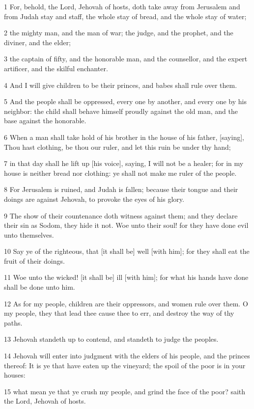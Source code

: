 \par 1 For, behold, the Lord, Jehovah of hosts, doth take away from Jerusalem and from Judah stay and staff, the whole stay of bread, and the whole stay of water;
\par 2 the mighty man, and the man of war; the judge, and the prophet, and the diviner, and the elder;
\par 3 the captain of fifty, and the honorable man, and the counsellor, and the expert artificer, and the skilful enchanter.
\par 4 And I will give children to be their princes, and babes shall rule over them.
\par 5 And the people shall be oppressed, every one by another, and every one by his neighbor: the child shall behave himself proudly against the old man, and the base against the honorable.
\par 6 When a man shall take hold of his brother in the house of his father, [saying], Thou hast clothing, be thou our ruler, and let this ruin be under thy hand;
\par 7 in that day shall he lift up [his voice], saying, I will not be a healer; for in my house is neither bread nor clothing: ye shall not make me ruler of the people.
\par 8 For Jerusalem is ruined, and Judah is fallen; because their tongue and their doings are against Jehovah, to provoke the eyes of his glory.
\par 9 The show of their countenance doth witness against them; and they declare their sin as Sodom, they hide it not. Woe unto their soul! for they have done evil unto themselves.
\par 10 Say ye of the righteous, that [it shall be] well [with him]; for they shall eat the fruit of their doings.
\par 11 Woe unto the wicked! [it shall be] ill [with him]; for what his hands have done shall be done unto him.
\par 12 As for my people, children are their oppressors, and women rule over them. O my people, they that lead thee cause thee to err, and destroy the way of thy paths.
\par 13 Jehovah standeth up to contend, and standeth to judge the peoples.
\par 14 Jehovah will enter into judgment with the elders of his people, and the princes thereof: It is ye that have eaten up the vineyard; the spoil of the poor is in your houses:
\par 15 what mean ye that ye crush my people, and grind the face of the poor? saith the Lord, Jehovah of hosts.
